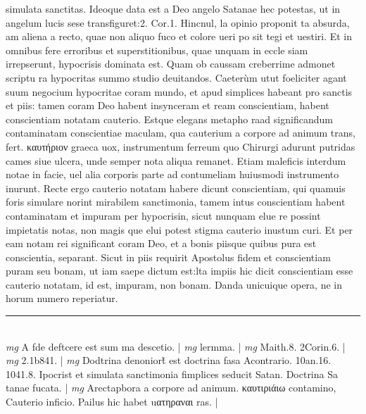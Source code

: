 \documentclass{article}
\begin{document}
\begin{pages}
simulata sanctitas. Ideoque data est a Deo angelo Satanae hec potestas, ut in angelum lucis sese transfiguret:2. Cor.1. Hincnul, la opinio proponit ta absurda, am aliena a recto, quae non aliquo fuco et colore ueri po sit tegi et uestiri. Et in omnibus fere erroribus et superstitionibus, quae unquam in eccle siam irrepserunt, hypocrisis dominata est. Quam ob caussam creberrime admonet scriptu ra hypocritas summo studio deuitandos. Caeterùm utut foeliciter agant suum negocium hypocritae coram mundo, et apud simplices habeant pro sanctis et piis: tamen coram Deo habent insynceram et ream conscientiam, habent conscientiam notatam cauterio. Estque elegans metapho raad significandum contaminatam conscientiae maculam, qua cauterium a corpore ad animum trans, fert. καυτήριον graeca uox, instrumentum ferreum quo Chirurgi adurunt putridas cames siue ulcera, unde semper nota aliqua remanet. Etiam maleficis interdum notae in facie, uel alia corporis parte ad contumeliam huiusmodi instrumento inurunt. Recte ergo cauterio notatam habere dicunt conscientiam, qui quamuis foris simulare norint mirabilem sanctimonia, tamem intus conscientiam habent contaminatam et impuram per hypocrisin, sicut nunquam elue re possint impietatis notas, non magis que elui potest stigma cauterio inustum curi. Et per eam notam rei significant coram Deo, et a bonis piisque quibus pura est conscientia, separant. Sicut in piis requirit Apostolus fidem et conscientiam puram seu bonam, ut iam saepe dictum est:lta impiis hic dicit conscientiam esse cauterio notatam, id est, impuram, non bonam. Danda unicuique opera, ne in horum numero reperiatur.  \pend
\vspace{0.5cm}\noindent
\vspace{0.2cm}\rule{1cm}{0.2pt}\\ 
\hspace{0.2cm}\textit{mg}
\footnotesize A fde deftcere est sum ma descetio. 
\normalsize| 
\hspace{0.2cm}\textit{mg}
\footnotesize lermma. 
\normalsize| 
\hspace{0.2cm}\textit{mg}
\footnotesize Maith.8. 2Corin.6. 
\normalsize| 
\hspace{0.2cm}\textit{mg}
\footnotesize 2.1b841. 
\normalsize| 
\hspace{0.2cm}\textit{mg}
\footnotesize Dodtrina denoniort̃ est doctrina fasa Acontrario. 10an.16. 1041.8. Ipocrist et simulata sanctimonia fimplices seducit Satan. Doctrina Sa tanae fucata. 
\normalsize| 
\hspace{0.2cm}\textit{mg}
\footnotesize Arectapbora a corpore ad animum. καυτιριάιω contamino, Cauterio inficio. Pailus hic habet uατηραναι ras. 
\normalsize| 

\end{pages}
\end{document}

